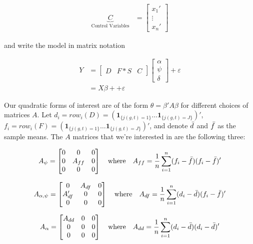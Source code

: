 \documentclass[12pt]{article}
\begin{document}
\begin{align*}
    \underbrace{C}_\text{Control Variables} &= \begin{bmatrix} x_1' \\ \vdots \\ x_n'  \end{bmatrix}
\end{align*}

and write the model in matrix notation

 \begin{align}
     Y &= \begin{bmatrix} D & F*S & C \end{bmatrix} \begin{bmatrix} \alpha \\ \psi \\ \delta \end{bmatrix} + \varepsilon\\
     &= X \beta + + \varepsilon
     \label{eq:matrix}
\end{align}
          
Our quadratic forms of interest are of the form $\theta = \beta' A \beta$ for different choices of matrices $A$. Let $d_i = row_i(D) = (\boldsymbol{1}_{\{j(g,t)=1\}}  \dots \boldsymbol{1}_{\{j(g,t)=J\}})'$,  $f_i = row_i(F) = (\boldsymbol{1}_{\{j(g,t)=1\}} \dots \boldsymbol{1}_{\{j(g,t)=J\}} )'$, and denote $\Bar{d}$ and $\Bar{f}$ as the sample means. The $A$ matrices that we're interested in are the following three:

\begin{align*}
A_{\psi} = \begin{bmatrix}
0 & 0 & 0\\
0 & A_{ff} & 0\\
0 & 0 & 0
\end{bmatrix} \quad \text{where} \quad A_{ff} = \frac{1}{n} \sum_{i=1}^n (f_i - \Bar{f})(f_i - \Bar{f})'
\end{align*}

\begin{align*}
A_{\alpha,\psi} = \begin{bmatrix}
0 & A_{df} & 0\\
A_{df}' & 0 & 0\\
0 & 0 & 0
\end{bmatrix} \quad \text{where} \quad A_{df} = \frac{1}{n} \sum_{i=1}^n (d_i - \Bar{d})(f_i - \Bar{f})'
\end{align*}

\begin{align*}
A_{\alpha} = \begin{bmatrix}
A_{dd} & 0 & 0\\
0 & 0 & 0\\
0 & 0 & 0
\end{bmatrix} \quad \text{where} \quad A_{dd} = \frac{1}{n} \sum_{i=1}^n (d_i - \Bar{d})(d_i - \Bar{d})'
\end{align*}
\end{document}
